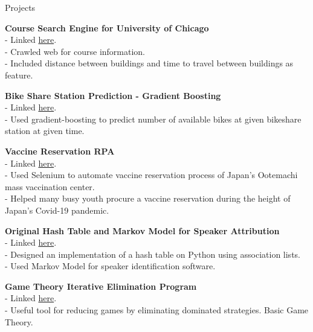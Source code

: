 \documentclass{resume} %
\begin{document}
\begin{rSection}{Projects}

{\bf Course Search Engine for University of Chicago}
\\- Linked \href{https://github.com/jaked0626/course_search_engine}{here}. 
\\- Crawled web for course information. 
\\- Included distance between buildings and time to travel between buildings as feature. 


{\bf Bike Share Station Prediction - Gradient Boosting}
\\- Linked \href{https://github.com/jaked0626/bikeshare-gradientboost}{here}. 
\\- Used gradient-boosting to predict number of available bikes at given bikeshare station at given time. 

{\bf Vaccine Reservation RPA}
\\-  Linked \href{https://github.com/jaked0626/Vaccine_reservation_tool}{here}. 
\\- Used Selenium to automate vaccine reservation process of Japan's Ootemachi mass vaccination center. 
\\- Helped many busy youth procure a vaccine reservation during the height of Japan's Covid-19 pandemic. 

{\bf Original Hash Table and Markov Model for Speaker Attribution}
\\- Linked \href{https://github.com/jaked0626/markov_speaker_attribution}{here}. 
\\- Designed an implementation of a hash table on Python using association lists. 
\\- Used Markov Model for speaker identification software. 

{\bf Game Theory Iterative Elimination Program}
\\- Linked \href{https://github.com/jaked0626/game_reduction}{here}. 
\\- Useful tool for reducing games by eliminating dominated strategies. Basic Game Theory. 


\end{rSection}
\end{document}
